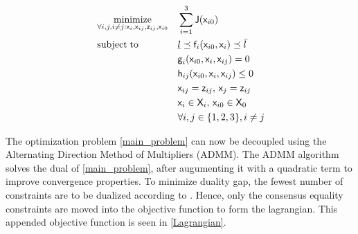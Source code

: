 \documentclass[letterpaper, 10 pt, conference]{ieeeconf}
\newcommand{\ubar}[1]{\text{\b{$#1$}}}
\DeclareMathOperator*{\minimize}{minimize}
\DeclareMathOperator*{\subj}{subject\;to}
\newcommand{\cx}{\textsf{x}}
\newcommand{\cz}{\textsf{z}}
\newcommand{\J}{\textsf{J}}
\newcommand{\cf}{\textsf{f}}
\newcommand{\cg}{\textsf{g}}
\newcommand{\ch}{\textsf{h}}
\newcommand{\X}{\textsf{X}}
\begin{document}
   \begin{equation}
     \label{main_problem}
     \begin{aligned}
       & \minimize_{\forall i,j,i \neq j:\cx_i,\cx_{ij},\cz_{ij},\cx_{i0}} &&  \sum\limits_{i=1}^{3}\J(\cx_{i0}) \\
       & \subj
       && \ubar{l} \preceq \cf_i(\cx_{i0},\cx_i) \preceq \bar{l}\\
       &       && \cg_i(\cx_{i0},\cx_i,\cx_{ij}) = 0 \\
       &		&& \ch_{ij}(\cx_{i0},\cx_i,\cx_{ij}) \leq 0 \\
       & 		&& \cx_{ij} = \cz_{ij},\, \cx_{j} = \cz_{ij} \\
       &		&& \cx_i \in \X_i,\, \cx_{i0} \in \X_0 \\
       &                                && \forall i,j \in \{1,2,3\}, i \neq j
     \end{aligned}
   \end{equation}

  \indent
 The optimization problem \eqref{main_problem} can now be decoupled using the Alternating Direction Method of Multipliers (ADMM). The ADMM algorithm solves the dual of \eqref{main_problem}, after augumenting it with a quadratic term to improve convergence properties. To minimize duality gap, the fewest number of constraints are to be dualized according to \cite{c8}. Hence, only the consensus equality constraints are moved into the objective function to form the lagrangian. This appended objective function is seen in \eqref{Lagrangian}.
\end{document}
